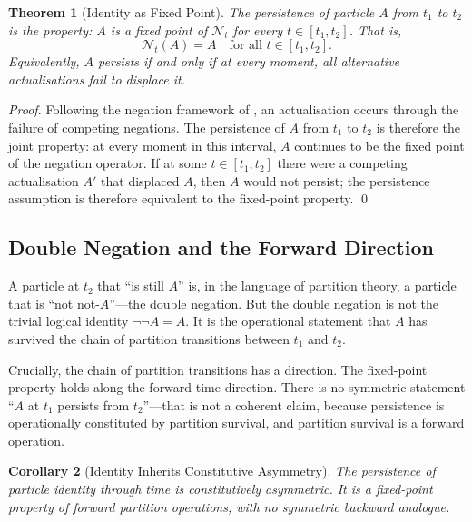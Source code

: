\documentclass[twocolumn,10pt,a4paper]{article}
\newtheorem{theorem}{Theorem}[section]
\newtheorem{corollary}[theorem]{Corollary}
\theoremstyle{definition}
\theoremstyle{remark}
\newcommand{\Negation}{\mathcal{N}}
\begin{document}
\begin{theorem}[Identity as Fixed Point]
\label{thm:identity-fixed-point}
The persistence of particle $A$ from $t_1$ to $t_2$ is the property: $A$ is a fixed point of $\Negation_t$ for every $t \in [t_1, t_2]$. That is,
\begin{equation}
    \Negation_t(A) = A \quad \text{for all } t \in [t_1, t_2].
\end{equation}
Equivalently, $A$ persists if and only if at every moment, all alternative actualisations fail to displace it.
\end{theorem}

\begin{proof}
Following the negation framework of \citep{sachikonye2025partition,sachikonye2025loschmidt}, an actualisation occurs through the failure of competing negations. The persistence of $A$ from $t_1$ to $t_2$ is therefore the joint property: at every moment in this interval, $A$ continues to be the fixed point of the negation operator. If at some $t \in [t_1, t_2]$ there were a competing actualisation $A'$ that displaced $A$, then $A$ would not persist; the persistence assumption is therefore equivalent to the fixed-point property. \qed
\end{proof}

\subsection{Double Negation and the Forward Direction}

A particle at $t_2$ that ``is still $A$'' is, in the language of partition theory, a particle that is ``not not-$A$''---the double negation. But the double negation is not the trivial logical identity $\neg\neg A = A$. It is the operational statement that $A$ has survived the chain of partition transitions between $t_1$ and $t_2$.

Crucially, the chain of partition transitions has a direction. The fixed-point property holds along the forward time-direction. There is no symmetric statement ``$A$ at $t_1$ persists from $t_2$''---that is not a coherent claim, because persistence is operationally constituted by partition survival, and partition survival is a forward operation.

\begin{corollary}[Identity Inherits Constitutive Asymmetry]
\label{cor:identity-asymmetry}
The persistence of particle identity through time is constitutively asymmetric. It is a fixed-point property of forward partition operations, with no symmetric backward analogue.
\end{corollary}
\end{document}
